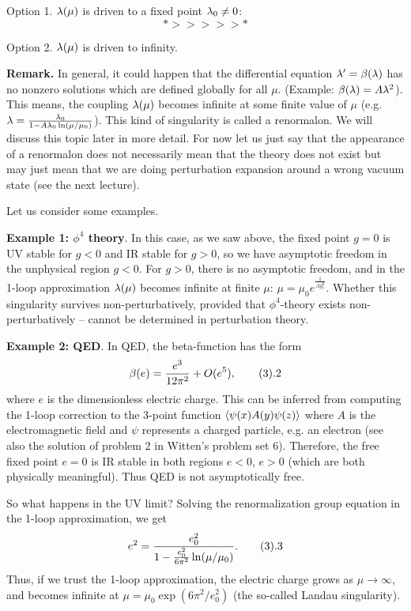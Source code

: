 Option 1. $\lambda(\mu)$ is driven to a fixed point $\lambda_0\ne 0$:
$$
*>>>>>*
$$

Option 2. $\lambda(\mu)$ is driven to infinity. 

{\bf Remark.} In general, it could happen that the differential
equation $\lambda'=\beta(\lambda)$ has no nonzero solutions which are 
defined globally for all $\mu$. (Example: $\beta(\lambda)=A\lambda^2$). 
This means, the coupling $\lambda(\mu)$ becomes infinite
at some finite value of $\mu$ (e.g. $\lambda=\frac{\lambda_0}{1-A\lambda_0\ln(\mu/\mu_0)}$).
This kind of singularity is called a renormalon. We will discuss this topic 
later in more detail. For now let us just say that the appearance of
a renormalon does not necessarily 
mean that the theory does not exist but may just mean 
that we are doing perturbation expansion around a wrong vacuum state
(see the next lecture). 

Let us consider some examples. 

{\bf Example 1: $\phi^4$ theory}. In this case, as we saw above, 
the fixed point $g=0$ is UV stable for $g<0$ and IR stable for $g>0$, so 
we have asymptotic freedom in the unphysical region $g<0$. 
For $g>0$, there is no asymptotic freedom, and
in the 1-loop approximation $\lambda(\mu)$ becomes infinite
at finite $\mu$: $\mu=\mu_0e^{\frac{1}{Ag_*^0}}$. 
Whether this singularity survives non-perturbatively, 
provided that $\phi^4$-theory exists non-perturbatively -- 
cannot be determined in perturbation theory. 

{\bf Example 2: QED}. In QED, the beta-function has the form
$$
\beta(e)=\frac{e^3}{12\pi^2}+O(e^5),\tag 3.2
$$
where $e$ is the dimensionless electric charge. 
This can be inferred from computing the 1-loop correction to 
the 3-point function $\langle\psi(x)A(y)\psi(z)\rangle$ 
where $A$ is the electromagnetic field and $\psi$ represents a charged 
particle, e.g. an electron
(see also the solution of problem 2 in Witten's problem set 6). 
Therefore, the free fixed point 
$e=0$ is IR stable in both regions $e<0$, $e>0$ 
(which are both physically meaningful). 
Thus QED is not asymptotically free. 

So what happens 
in the UV limit? Solving the renormalization group equation
in the 1-loop approximation, we get
$$
e^2=\frac{e_0^2}{1-\frac{e_0^2}{6\pi^2}\ln(\mu/\mu_0)}.\tag 3.3
$$
Thus, if we trust the 1-loop approximation, the electric charge 
grows as $\mu\to\infty$, and becomes infinite at 
$\mu=\mu_0\exp(6\pi^2/e_0^2)$ (the so-called Landau singularity). 

